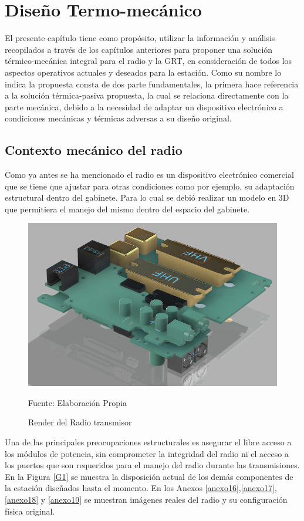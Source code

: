 \chapter{Diseño Termo-mecánico}

El presente capítulo tiene como propósito, utilizar la información y análisis recopilados a través de los capítulos anteriores para proponer una solución térmico-mecánica integral para el radio y la GRT, en consideración de todos los aspectos operativos actuales y deseados para la estación. Como su nombre lo indica la propuesta consta de dos parte fundamentales, la primera hace referencia a la solución térmica-pasiva propuesta, la cual se relaciona directamente con la parte mecánica, debido a la necesidad de adaptar un dispositivo electrónico a condiciones mecánicas y térmicas adversas a su diseño original.

\section{Contexto mecánico del radio}

Como ya antes se ha mencionado el radio es un dispositivo electrónico comercial  que se tiene que ajustar para otras condiciones como por ejemplo, su adaptación estructural dentro del gabinete. Para lo cual se debió realizar un modelo en 3D que permitiera el manejo del mismo dentro del espacio del gabinete.

\begin{figure}[H]
\centering
\includegraphics[scale=0.6]{Figuras/G5.png}
\caption{Render del Radio transmisor}
Fuente: Elaboración Propia
\label{G5}
\end{figure}

Una de las principales preocupaciones estructurales es asegurar el libre acceso a los módulos de potencia, sin comprometer la integridad del radio ni el acceso a los puertos que son requeridos para el manejo del radio durante las transmisiones. En la Figura \ref{G1} se muestra la disposición actual de los demás componentes de la estación diseñados hasta el momento. En los Anexos \ref{anexo16},\ref{anexo17},\ref{anexo18} y \ref{anexo19} se muestran imágenes reales del radio y su configuración física original. 

